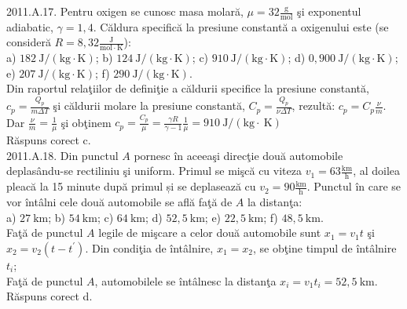 2011.A.17. Pentru oxigen se cunosc masa molară, $\mu=32 \frac{\mathrm{g}}{\mathrm{mol}}$ şi exponentul adiabatic, $\gamma=1,4$. Căldura specifică la presiune constantă a oxigenului este (se consideră $R=8,32 \frac{\mathrm{J}}{\mathrm{mol} \cdot \mathrm{K}}$):\\ a) $182 \mathrm{~J} /(\mathrm{kg} \cdot \mathrm{K})$; b) $124 \mathrm{~J} /(\mathrm{kg} \cdot \mathrm{K})$; c) $910 \mathrm{~J} /(\mathrm{kg} \cdot \mathrm{K})$; d) $0,900 \mathrm{~J} /(\mathrm{kg} \cdot \mathrm{K})$; e) $207 \mathrm{~J} /(\mathrm{kg} \cdot \mathrm{K})$; f) $290 \mathrm{~J} /(\mathrm{kg} \cdot \mathrm{K})$.\\ Din raportul relaţiilor de definiţie a căldurii specifice la presiune constantă, $c_{p}=\frac{Q_{p}}{m \Delta T}$ şi căldurii molare la presiune constantă, $C_{p}=\frac{Q_{p}}{\nu \Delta T}$, rezultă: $c_{p}=C_{p} \frac{\nu}{m}$. Dar $\frac{\nu}{m}=\frac{1}{\mu}$ şi obţinem $c_{p}=\frac{C_{p}}{\mu}=\frac{\gamma R}{\gamma-1} \frac{1}{\mu}=910 \mathrm{~J} /(\mathrm{kg} \cdot \mathrm{~K})$\\ Răspuns corect c.\\

2011.A.18. Din punctul $A$ pornesc în aceeaşi direcţie două automobile deplasându-se rectiliniu şi uniform. Primul se mişcă cu viteza $v_{1}=63 \frac{\mathrm{km}}{\mathrm{h}}$, al doilea pleacă la 15 minute după primul și se deplasează cu $v_{2}=90 \frac{\mathrm{km}}{\mathrm{h}}$. Punctul în care se vor întâlni cele două automobile se află faţă de $A$ la distanţa:\\ a) $27 \mathrm{~km}$; b) $54 \mathrm{~km}$; c) $64 \mathrm{~km}$; d) $52,5 \mathrm{~km}$; e) $22,5 \mathrm{~km}$; f) $48,5 \mathrm{~km}$.\\ Faţă de punctul $A$ legile de mişcare a celor două automobile sunt $x_{1}=v_{1} t$ şi $x_{2}=v_{2}\left(t-t^{\prime}\right)$. Din condiţia de întâlnire, $x_{1}=x_{2}$, se obţine timpul de întâlnire $t_{i}$;\\ Faţă de punctul $A$, automobilele se întâlnesc la distanţa $x_{i}=v_{1} t_{i}=52,5 \mathrm{~km}$.\\ Răspuns corect d.\\
